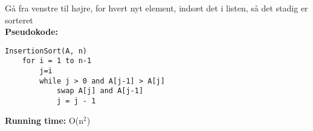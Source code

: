 Gå fra venstre til højre, for hvert nyt element, indsæt det i listen, så det stadig er sorteret\\
\textbf{Pseudokode:}
\begin{lstlisting}[frame=single, mathescape=true]
InsertionSort(A, n)
	for i = 1 to n-1
		j=i
		while j > 0 and A[j-1] > A[j]
			swap A[j] and A[j-1]
			j = j - 1
\end{lstlisting}
\textbf{Running time:} O(n$^2$)
